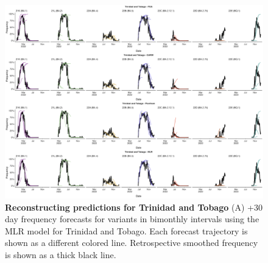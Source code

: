 \begin{figure}[th!]
	\centering
	\includegraphics[width=0.9\textwidth=0.01]{supp_figures/supplementary_fig_Trinidad and Tobago.png}
	\caption[\textbf{Reconstructing predictions for Trinidad and Tobago}]{
		\textbf{Reconstructing predictions for Trinidad and Tobago}
		(A) +30 day frequency forecasts for variants in bimonthly intervals using the MLR model for Trinidad and Tobago.
		Each forecast trajectory is shown as a different colored line.
		Retrospective smoothed frequency is shown as a thick black line.
	}
	\label{fig:S5}
\end{figure}


